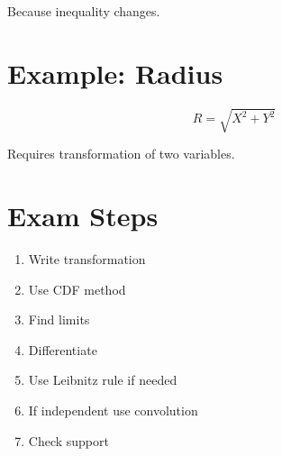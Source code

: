 \documentclass[12pt]{article}
\begin{document}
Because inequality changes.

\section{Example: Radius}

\[
R = \sqrt{X^2 + Y^2}
\]

Requires transformation of two variables.

\section{Exam Steps}

\begin{enumerate}
\item Write transformation
\item Use CDF method
\item Find limits
\item Differentiate
\item Use Leibnitz rule if needed
\item If independent use convolution
\item Check support
\end{enumerate}
\end{document}
